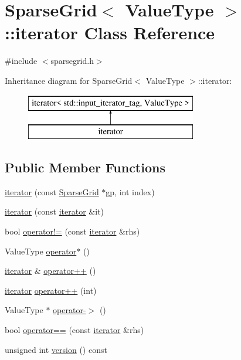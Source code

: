 \hypertarget{classSparseGrid_1_1iterator}{}\section{Sparse\+Grid$<$ Value\+Type $>$\+:\+:iterator Class Reference}
\label{classSparseGrid_1_1iterator}


{\ttfamily \#include $<$sparsegrid.\+h$>$}

Inheritance diagram for Sparse\+Grid$<$ Value\+Type $>$\+:\+:iterator\+:\begin{figure}[H]
\begin{center}
\leavevmode
\includegraphics[height=2.000000cm]{classSparseGrid_1_1iterator}
\end{center}
\end{figure}
\subsection*{Public Member Functions}
\begin{DoxyCompactItemize}
\item 
\mbox{\hyperlink{classSparseGrid_1_1iterator_a0daafb32de45798b98815d40864c24ab}{iterator}} (const \mbox{\hyperlink{classSparseGrid}{Sparse\+Grid}} $\ast$gp, int index)
\item 
\mbox{\hyperlink{classSparseGrid_1_1iterator_a698b7553261e7209d6c29fb55627dce4}{iterator}} (const \mbox{\hyperlink{classSparseGrid_1_1iterator}{iterator}} \&it)
\item 
bool \mbox{\hyperlink{classSparseGrid_1_1iterator_ae1983f2cb0df1f0cbe77ac29590e2e2b}{operator!=}} (const \mbox{\hyperlink{classSparseGrid_1_1iterator}{iterator}} \&rhs)
\item 
Value\+Type \mbox{\hyperlink{classSparseGrid_1_1iterator_a52706ab27261cb9b9cf026c0ef0be9ca}{operator$\ast$}} ()
\item 
\mbox{\hyperlink{classSparseGrid_1_1iterator}{iterator}} \& \mbox{\hyperlink{classSparseGrid_1_1iterator_af1b1c7856a59f34c7d3570f946a2ff00}{operator++}} ()
\item 
\mbox{\hyperlink{classSparseGrid_1_1iterator}{iterator}} \mbox{\hyperlink{classSparseGrid_1_1iterator_a538d230f8b52d2bc0950e26ce74ec239}{operator++}} (int)
\item 
Value\+Type $\ast$ \mbox{\hyperlink{classSparseGrid_1_1iterator_a5ba42337ec7bae549bb135838933b0ea}{operator-\/$>$}} ()
\item 
bool \mbox{\hyperlink{classSparseGrid_1_1iterator_a798956e7a65ef16c891d129b3ced0f9e}{operator==}} (const \mbox{\hyperlink{classSparseGrid_1_1iterator}{iterator}} \&rhs)
\item 
unsigned int \mbox{\hyperlink{classSparseGrid_1_1iterator_a0aa696ccb72cbf928535d6b646bac1aa}{version}} () const
\end{DoxyCompactItemize}


